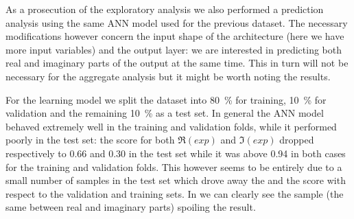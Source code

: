 As a prosecution of the exploratory analysis we also performed a prediction analysis using the same ANN model used for the previous dataset.
The necessary modifications however concern the input shape of the architecture (here we have more input variables) and the output layer: we are interested in predicting both real and imaginary parts of the output at the same time.
This in turn will not be necessary for the aggregate analysis but it might be worth noting the results.

For the learning model we split the dataset into \SI{80}{\percent} for training, \SI{10}{\percent} for validation and the remaining \SI{10}{\percent} as a test set.
In general the ANN model behaved extremely well in the training and validation folds, while it performed poorly in the test set: the \rr score for both $\Re(exp)$ and $\Im(exp)$ dropped respectively to \num{0.66} and \num{0.30} in the test set while it was above \num{0.94} in both cases for the training and validation folds.\footnotemark{}
This however seems to be entirely due to a small number of samples in the test set which drove away the \mse and the \rr score with respect to the validation and training sets.
In  we can clearly see the sample (the same between real and imaginary parts) spoiling the result.

